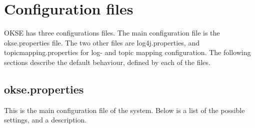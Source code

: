 \clearpage

\section{Configuration files}
\label{sec:configuration_files}
OKSE has three configurations files. The main configuration file is the okse.properties file. The two other files are log4j.properties, and topicmapping.properties for log- and topic mapping configuration. The following sections describe the default behaviour, defined by each of the files.

\subsection{okse.properties}
\label{subsec:configuration_files-okse.properties}
 
This is the main configuration file of the system. Below is a list of the possible settings, and a description.

